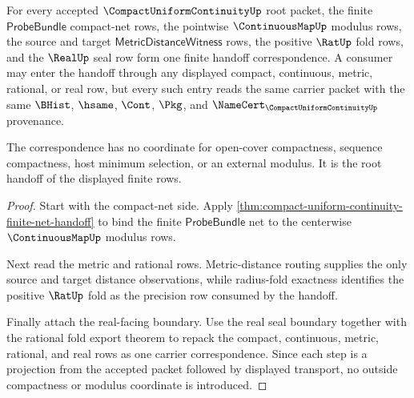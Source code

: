 \begin{theorem}
\label{thm:compact-uniform-continuity-four-source-handoff-correspondence}
For every accepted $\CompactUniformContinuityUp$ root packet, the finite $\mathsf{ProbeBundle}$ compact-net rows, the pointwise $\ContinuousMapUp$ modulus rows, the source and target $\mathsf{MetricDistanceWitness}$ rows, the positive $\RatUp$ fold rows, and the $\RealUp$ seal row form one finite handoff correspondence. A consumer may enter the handoff through any displayed compact, continuous, metric, rational, or real row, but every such entry reads the same carrier packet with the same $\BHist$, $\hsame$, $\Cont$, $\Pkg$, and $\NameCert_{\CompactUniformContinuityUp}$ provenance.

The correspondence has no coordinate for open-cover compactness, sequence compactness, host minimum selection, or an external modulus. It is the root handoff of the displayed finite rows.
\end{theorem}
\begin{proof}
Start with the compact-net side. Apply \autoref{thm:compact-uniform-continuity-finite-net-handoff} to bind the finite $\mathsf{ProbeBundle}$ net to the centerwise $\ContinuousMapUp$ modulus rows.

Next read the metric and rational rows. Metric-distance routing supplies the only source and target distance observations, while radius-fold exactness identifies the positive $\RatUp$ fold as the precision row consumed by the handoff.

Finally attach the real-facing boundary. Use the real seal boundary together with the rational fold export theorem to repack the compact, continuous, metric, rational, and real rows as one carrier correspondence. Since each step is a projection from the accepted packet followed by displayed transport, no outside compactness or modulus coordinate is introduced.
\end{proof}
